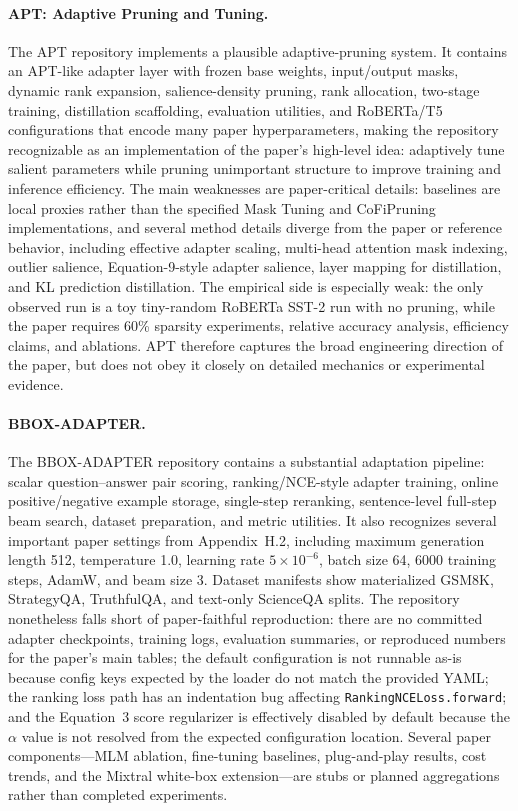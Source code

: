 \documentclass[11pt]{article}
\begin{document}
\paragraph{APT: Adaptive Pruning and Tuning.} The APT repository
implements a plausible adaptive-pruning system. It contains an
APT-like adapter layer with frozen base weights, input/output masks,
dynamic rank expansion, salience-density pruning, rank allocation,
two-stage training, distillation scaffolding, evaluation utilities,
and RoBERTa/T5 configurations that encode many paper hyperparameters,
making the repository recognizable as an implementation of the
paper's high-level idea: adaptively tune salient parameters while
pruning unimportant structure to improve training and inference
efficiency. The main weaknesses are paper-critical details: baselines
are local proxies rather than the specified Mask Tuning and CoFiPruning
implementations, and several method details diverge from the paper or
reference behavior, including effective adapter scaling, multi-head
attention mask indexing, outlier salience, Equation-9-style adapter
salience, layer mapping for distillation, and KL prediction
distillation. The empirical side is especially weak: the only observed
run is a toy tiny-random RoBERTa SST-2 run with no pruning, while the
paper requires 60\% sparsity experiments, relative accuracy analysis,
efficiency claims, and ablations. APT therefore captures the broad
engineering direction of the paper, but does not obey it closely on
detailed mechanics or experimental evidence.

\paragraph{BBOX-ADAPTER.} The BBOX-ADAPTER repository contains a
substantial adaptation pipeline: scalar question--answer pair scoring,
ranking/NCE-style adapter training, online positive/negative example
storage, single-step reranking, sentence-level full-step beam search,
dataset preparation, and metric utilities. It also recognizes several
important paper settings from Appendix~H.2, including maximum
generation length 512, temperature 1.0, learning rate $5\!\times\!10^{-6}$,
batch size 64, 6000 training steps, AdamW, and beam size 3. Dataset
manifests show materialized GSM8K, StrategyQA, TruthfulQA, and
text-only ScienceQA splits. The repository nonetheless falls short of
paper-faithful reproduction: there are no committed adapter
checkpoints, training logs, evaluation summaries, or reproduced
numbers for the paper's main tables; the default configuration is not
runnable as-is because config keys expected by the loader do not match
the provided YAML; the ranking loss path has an indentation bug
affecting \texttt{RankingNCELoss.forward}; and the Equation~3 score
regularizer is effectively disabled by default because the
$\alpha$ value is not resolved from the expected configuration
location. Several paper components---MLM ablation, fine-tuning
baselines, plug-and-play results, cost trends, and the Mixtral
white-box extension---are stubs or planned aggregations rather than
completed experiments.
\end{document}
